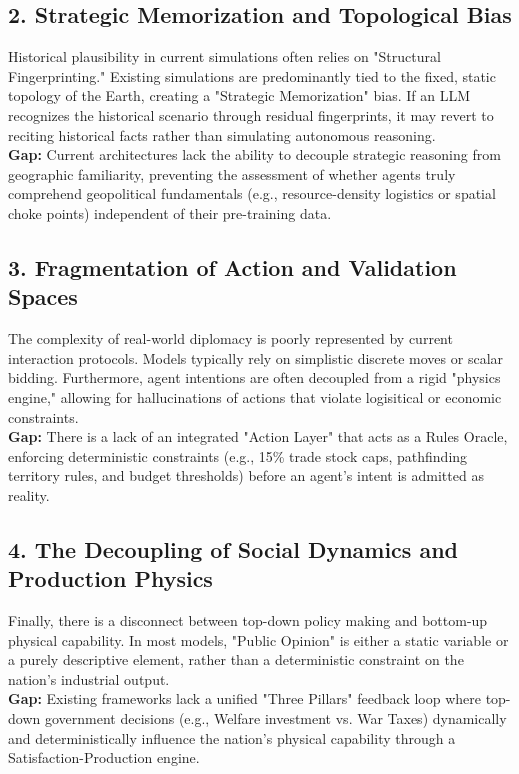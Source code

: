 \subsection*{2. Strategic Memorization and Topological Bias}
Historical plausibility in current simulations often relies on "Structural Fingerprinting."
Existing simulations are predominantly tied to the fixed, static topology of the Earth, creating a "Strategic Memorization" bias.
If an LLM recognizes the historical scenario through residual fingerprints, it may revert to reciting historical facts rather than simulating autonomous reasoning.
\\
\textbf{Gap:} Current architectures lack the ability to decouple strategic reasoning from geographic familiarity, preventing the assessment of whether agents truly comprehend geopolitical fundamentals (e.g., resource-density logistics or spatial choke points) independent of their pre-training data.

\subsection*{3. Fragmentation of Action and Validation Spaces}
The complexity of real-world diplomacy is poorly represented by current interaction protocols. Models typically rely on simplistic discrete moves or scalar bidding.
Furthermore, agent intentions are often decoupled from a rigid "physics engine," allowing for hallucinations of actions that violate logisitical or economic constraints.
\\
\textbf{Gap:} There is a lack of an integrated "Action Layer" that acts as a Rules Oracle, enforcing deterministic constraints (e.g., 15\% trade stock caps, pathfinding territory rules, and budget thresholds) before an agent's intent is admitted as reality.

\subsection*{4. The Decoupling of Social Dynamics and Production Physics}
Finally, there is a disconnect between top-down policy making and bottom-up physical capability.
In most models, "Public Opinion" is either a static variable or a purely descriptive element, rather than a deterministic constraint on the nation's industrial output.
\\
\textbf{Gap:} Existing frameworks lack a unified "Three Pillars" feedback loop where top-down government decisions (e.g., Welfare investment vs. War Taxes) dynamically and deterministically influence the nation's physical capability through a Satisfaction-Production engine.


